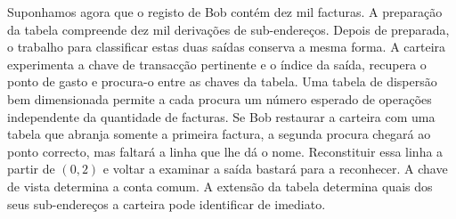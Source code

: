 Suponhamos agora que o registo de Bob contém dez mil facturas.
A preparação da tabela compreende dez mil derivações de
sub-endereços. Depois de preparada, o trabalho para classificar
estas duas saídas conserva a mesma forma. A carteira experimenta
a chave de transacção pertinente e o índice da saída, recupera o
ponto de gasto e procura-o entre as chaves da tabela. Uma tabela
de dispersão bem dimensionada permite a cada procura um número
esperado de operações independente da quantidade de facturas.
Se Bob restaurar a carteira com uma tabela que abranja somente a
primeira factura, a segunda procura chegará ao ponto correcto,
mas faltará a linha que lhe dá o nome. Reconstituir essa linha a
partir de \((0,2)\) e voltar a examinar a saída bastará para a
reconhecer. A chave de vista determina a conta comum. A extensão
da tabela determina quais dos seus sub-endereços a carteira pode
identificar de imediato.
